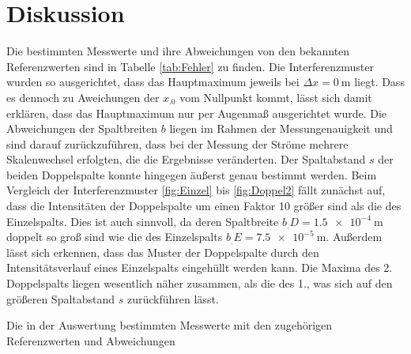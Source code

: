 
\section{Diskussion}
\label{sec:Diskussion}

Die bestimmten Messwerte und ihre Abweichungen von den bekannten Referenzwerten sind in Tabelle \ref{tab:Fehler} zu finden.
Die Interferenzmuster wurden so ausgerichtet, dass das Hauptmaximum jeweils bei $\Delta x =\SI{0}{\metre}$ liegt. Dass es dennoch zu Aweichungen der $x_.0$ vom Nullpunkt kommt, lässt sich damit erklären, dass das Hauptmaximum nur per Augenmaß ausgerichtet wurde.
Die Abweichungen der Spaltbreiten $b$ liegen im Rahmen der Messungenauigkeit und sind darauf zurückzuführen, dass bei der Messung der Ströme mehrere Skalenwechsel erfolgten, die die Ergebnisse veränderten. 
Der Spaltabstand $s$ der beiden Doppelspalte konnte hingegen äußerst genau bestimmt werden.
Beim Vergleich der Interferenzmuster \ref{fig:Einzel} bis \ref{fig:Doppel2} fällt zunächst auf, dass die Intensitäten der Doppelspalte um einen Faktor 10 größer sind als die des Einzelspalts. Dies ist auch sinnvoll, da deren Spaltbreite $b_.D=\SI{1,5e-4}{\metre}$ doppelt so groß sind wie die des Einzelspalts $b_.E=\SI{7,5e-5}{\metre}$. Außerdem lässt sich erkennen, dass das Muster der Doppelspalte durch den Intensitätsverlauf eines Einzelspalts eingehüllt werden kann.
Die Maxima des 2. Doppelspalts liegen wesentlich näher zusammen, als die des 1., was sich auf den größeren Spaltabstand $s$ zurückführen lässt.

\begin{table}
\centering
\caption{Die in der Auswertung bestimmten Messwerte mit den zugehörigen Referenzwerten und Abweichungen}

\label{tab:Fehler}
\end{table}
